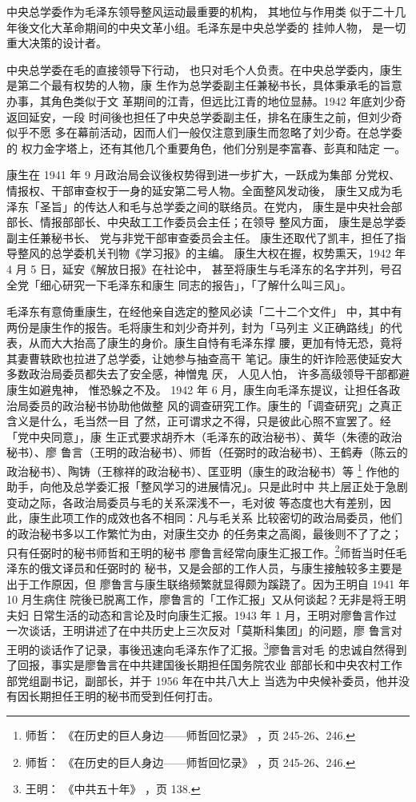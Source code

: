 中央总学委作为毛泽东领导整风运动最重要的机构，
其地位与作用类
似于二十几年後文化大革命期间的中央文革小组。毛泽东是中央总学委的
挂帅人物，
是一切重大决策的设计者。

中央总学委在毛的直接领导下行动，
也只对毛个人负责。在中央总学委内，康生是第二个最有权势的人物，康
生作为总学委副主任兼秘书长，具体秉承毛的旨意办事，其角色类似于文
革期间的江青，但远比江青的地位显赫。1942 年底刘少奇返回延安，一段
时间後也担任了中央总学委副主任，排名在康生之前，但刘少奇似乎不愿
多在幕前活动，因而人们一般仅注意到康生而忽略了刘少奇。在总学委的
权力金字塔上，还有其他几个重要角色，他们分别是李富春、彭真和陆定
一。

康生在 1941 年 9 月政治局会议後权势得到进一步扩大，一跃成为集部
分党权、情报权、干部审查权于一身的延安第二号人物。全面整风发动後，
康生又成为毛泽东「圣旨」的传达人和毛与总学委之间的联络员。在党内，
康生是中央社会部部长、情报部部长、中央敌工工作委员会主任；在领导
整风方面，
康生是总学委副主任兼秘书长、
党与非党干部审查委员会主任。
康生还取代了凯丰，担任了指导整风的总学委机关刊物《学习报》的主编。
康生大权在握，权势熏天，1942 年 4 月 5 日，延安《解放日报》在社论中，
甚至将康生与毛泽东的名字并列，号召全党「细心研究一下毛泽东和康生
同志的报告」，「了解什么叫三风」。

毛泽东有意倚重康生，在经他亲自选定的整风必读「二十二个文件」
中，其中有两份是康生作的报告。毛将康生和刘少奇并列，封为「马列主
义正确路线」的代表，从而大大抬高了康生的身价。康生自恃有毛泽东撑
腰，更加有恃无恐，竟将其妻曹轶欧也拉进了总学委，让她参与抽查高干
笔记。康生的奸诈险恶使延安大多数政治局委员都失去了安全感，神憎鬼
厌，
人见人怕，
许多高级领导干部都避康生如避鬼神，
惟恐躲之不及。
1942
年 6 月，康生向毛泽东提议，让担任各政治局委员的政治秘书协助他做整
风的调查研究工作。康生的「调查研究」之真正含义是什么，毛当然一目
了然，正可谓求之不得，只是彼此心照不宣罢了。经「党中央同意」，康
生正式要求胡乔木（毛泽东的政治秘书）、黄华（朱德的政治秘书）、廖
鲁言（王明的政治秘书）、师哲（任弼时的政治秘书）、王鹤寿（陈云的
政治秘书）、陶铸（王稼祥的政治秘书）、匡亚明（康生的政治秘书）等
\footnote{师哲：
《在历史的巨人身边——师哲回忆录》
，页 245-26、246.}
作他的助手，向他及总学委汇报「整风学习的进展情况」。只是此时中
共上层正处于急剧变动之际，各政治局委员与毛的关系深浅不一，毛对彼
等态度也大有差别，因此，康生此项工作的成效也各不相同：凡与毛关系
比较密切的政治局委员，他们的政治秘书多以工作繁忙为由，对康生交办
的任务束之高阁，最後则不了了之；只有任弼时的秘书师哲和王明的秘书
廖鲁言经常向康生汇报工作。\footnote{师哲：
《在历史的巨人身边——师哲回忆录》
，页 245-26、246.}师哲当时任毛泽东的俄文译员和任弼时的
秘书，又是会部的工作人员，与康生接触较多主要是出于工作原因，但
廖鲁言与康生联络频繁就显得颇为蹊跷了。因为王明自 1941 年 10 月生病住
院後已脱离工作，廖鲁言的「工作汇报」又从何谈起？无非是将王明夫妇
日常生活的动态和言论及时向康生汇报。1943 年 1 月，王明对廖鲁言作过
一次谈话，王明讲述了在中共历史上三次反对「莫斯科集团」的问题，廖
鲁言对王明的谈话作了记录，事後迅速向毛泽东作了汇报。\footnote{王明：
《中共五十年》
，页 138.}廖鲁言对毛
的忠诚自然得到了回报，事实是廖鲁言在中共建国後长期担任国务院农业
部部长和中央农村工作部党组副书记，副部长，并于 1956 年在中共八大上
当选为中央候补委员，他并没有因长期担任王明的秘书而受到任何打击。


